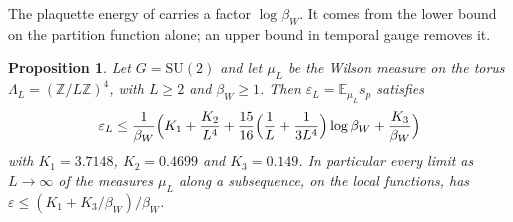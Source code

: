 \documentclass[aps,prd,twocolumn,superscriptaddress,nofootinbib,longbibliography,floatfix,amsmath,amssymb,10pt]{revtex4-2}
\newtheorem{proposition}[theorem]{Proposition}
\theoremstyle{definition}
\theoremstyle{remark}
\newcommand{\Z}{\mathbb{Z}}
\newcommand{\E}{\mathbb{E}}
\newcommand{\SU}{\mathrm{SU}}
\begin{document}
The plaquette energy of \cite[Lemma~382]{BBLR26} carries a factor
$\log\beta_W$. It comes from the lower bound on the partition function alone;
an upper bound in temporal gauge removes it.

\begin{proposition}\label{prop:energybeta}
Let $G=\SU(2)$ and let $\mu_L$ be the Wilson measure on the torus
$\Lambda_L=(\Z/L\Z)^4$, with $L\ge2$ and $\beta_W\ge1$. Then
$\varepsilon_L=\E_{\mu_L}s_p$ satisfies
\[
\varepsilon_L\le\frac1{\beta_W}\Bigl(K_1+\frac{K_2}{L^4}+\frac{15}{16}\Bigl(
\frac1L+\frac1{3L^4}\Bigr)\log\beta_W+\frac{K_3}{\beta_W}\Bigr)
\]
with $K_1=3.7148$, $K_2=0.4699$ and $K_3=0.149$. In particular every limit as
$L\to\infty$ of the measures $\mu_L$ along a subsequence, on the local
functions, has $\varepsilon\le(K_1+K_3/\beta_W)/\beta_W$.
\end{proposition}
\end{document}
